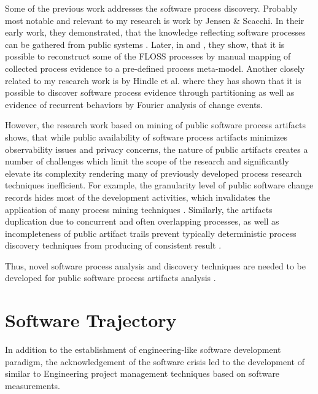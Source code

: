Some of the previous work addresses the software process discovery. Probably most notable and relevant to 
my research is work by Jensen \& Scacchi. In their early work, they demonstrated, that the knowledge
reflecting software processes can be gathered from public systems \cite{citeulike:12550640}. 
Later, in \cite{citeulike:5043664} and \cite{citeulike:5128808}, they show, that it is possible to 
reconstruct some of the FLOSS processes by manual mapping of collected process evidence to a pre-defined 
process meta-model. 
Another closely related to my research work is by Hindle et al. where they has shown that it is possible to 
discover software process evidence through partitioning \cite{citeulike:10377366} as well as evidence of 
recurrent behaviors by Fourier analysis of change events\cite{citeulike:10377345}.

However, the research work based on mining of public software process artifacts shows, that while public 
availability of software process artifacts minimizes observability issues and privacy concerns, 
the nature of public artifacts creates a number of challenges which limit the scope of the research and 
significantly elevate its complexity rendering many of previously developed process research techniques 
inefficient. For example, the granularity level of public software change records hides most of the 
development activities, which invalidates the application of many process mining techniques 
\cite{citeulike:10377366} \cite{citeulike:2678511}.
Similarly, the artifacts duplication due to concurrent and often overlapping processes, 
as well as incompleteness of public artifact trails prevent typically deterministic process discovery
techniques from producing of consistent result \cite{citeulike:2678511}.

Thus, novel software process analysis and discovery techniques are needed to be developed for public software 
process artifacts analysis \cite{citeulike:7853299}.

%
%
\section{Software Trajectory}\label{section_software_trajectory}
In addition to the establishment of engineering-like software development paradigm, the acknowledgement of 
the software crisis led to the development of similar to Engineering project management techniques based on 
software measurements.


